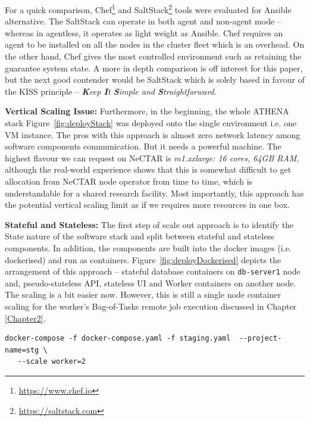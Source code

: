 For a quick comparison, Chef\footnote{\url{https://www.chef.io}} and SaltStack\footnote{\url{https://saltstack.com}} tools were evaluated for Ansible alternative. The SaltStack can operate in both agent and non-agent mode -- whereas in agentless, it operates as light weight as Ansible. Chef requires an agent to be installed on all the nodes in the cluster fleet which is an overhead. On the other hand, Chef gives the most controlled environment such as retaining the guarantee system state. A more in depth comparison is off interest for this paper, but the next good contender would be SaltStack which is solely based in favour of the KISS principle -- \textit{\textbf{K}eep \textbf{I}t \textbf{S}imple and \textbf{S}traightforward}.

\textbf{Vertical Scaling Issue:} \quad Furthermore, in the beginning, the whole ATHENA stack Figure~\ref{fig:deployStack} was deployed onto the single environment i.e. one VM instance. The pros with this approach is almost zero network latency among software components communication. But it needs a powerful machine. The highest flavour we can request on NeCTAR is \textit{m1.xxlarge: 16 cores, 64GB RAM}, although the real-world experience shows that this is somewhat difficult to get allocation from NeCTAR node operator from time to time, which is understandable for a shared research facility. Most importantly, this approach has the potential vertical scaling limit as if we requires more resources in one box.

\textbf{Stateful and Stateless:} \quad The first step of scale out approach is to identify the State nature of the software stack and split between stateful and stateless components. In addition, the components are built into the docker images (i.e. dockerised) and run as containers. Figure~\ref{fig:deployDockerised} depicts the arrangement of this approach -- stateful database containers on \verb|db-server1| node and, pseudo-stateless API, stateless UI and Worker containers on another node. The scaling is a bit easier now. However, this is still a single node container scaling for the worker's Bag-of-Tasks remote job execution discussed in Chapter \ref{Chapter2}.

\begin{verbatim}
docker-compose -f docker-compose.yaml -f staging.yaml  --project-name=stg \
   --scale worker=2
\end{verbatim}

